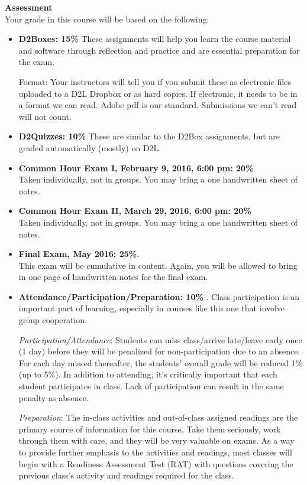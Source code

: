 {\bf Assessment}\\
Your grade in this course will be based on the following: 
\begin{itemize}
\item  {\bf D2Boxes: 15\%}  These assignments  will help you learn
  the course material and software through 
  reflection and practice and are essential preparation for the exam. 

  Format: Your instructors will tell you if you submit these as
  electronic files uploaded to a D2L Dropbox or as hard copies. If electronic,
  it needs to be in a format we can read.  Adobe pdf is our standard.
  Submissions we can't read will not count.

\item {\bf D2Quizzes:  10\%} These are similar to the D2Box
  assignments, but are graded automatically (mostly) on D2L.

\item {\bf Common Hour Exam I, February 9, 2016, 6:00 pm: \hfill 20\%}\\  
  Taken individually, not in groups. You may bring a one handwritten
  sheet of notes.  

\item {\bf Common Hour Exam II, March 29, 2016, 6:00 pm: \hfill    20\%}\\
  Taken individually, not in groups. You may bring a one handwritten sheet
  of notes. 

\item {\bf Final Exam, May  2016: \hfill 25\%}.\\
  This exam will be cumulative in content. Again, you will be allowed
  to bring in one page of handwritten notes for the final exam.   
 
\item {\bf Attendance/Participation/Preparation:  10\%} . Class
  participation is an important part of learning, especially in
  courses like this one that involve group cooperation.    

  {\it Participation/Attendance}: Students can miss class/arrive
  late/leave early once (1 day) before they will be penalized for
  non-participation due to an absence.  For each day missed
  thereafter, the students’ overall grade will be reduced 1\% (up to
  5\%).   In addition to attending, it's critically important that
  each student participates in class. Lack of participation can result
  in the same penalty as absence.

  {\it Preparation}: The in-class activities and out-of-class assigned
  readings are the primary source of  information for this course.
  Take them seriously, work through them with care, and they will be
  very valuable on exams.  As a way to provide further emphasis to the
  activities and readings, most classes will begin with a Readiness
  Assessment Test (RAT) with questions covering the previous class's
  activity and readings required for the class.   
\end{itemize}

